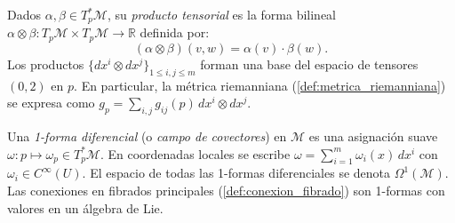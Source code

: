 \begin{definition}\label{def:producto_tensorial_covectores}
Dados $\alpha, \beta \in T_p^*\mathcal{M}$, su \textit{producto tensorial} es la forma bilineal $\alpha \otimes \beta: T_p\mathcal{M} \times T_p\mathcal{M} \to \mathbb{R}$ definida por:
\[
(\alpha \otimes \beta)(v, w) = \alpha(v) \cdot \beta(w).
\]
Los productos $\{dx^i \otimes dx^j\}_{1 \leq i,j \leq m}$ forman una base del espacio de tensores $(0,2)$ en $p$. En particular, la métrica riemanniana (\autoref{def:metrica_riemanniana}) se expresa como $g_p = \sum_{i,j} g_{ij}(p) \, dx^i \otimes dx^j$.
\end{definition}

\begin{definition}\label{def:1_forma_diferencial}
Una \textit{1-forma diferencial} (o \textit{campo de covectores}) en $\mathcal{M}$ es una asignación suave $\omega: p \mapsto \omega_p \in T_p^*\mathcal{M}$. En coordenadas locales se escribe $\omega = \sum_{i=1}^m \omega_i(x) \, dx^i$ con $\omega_i \in C^\infty(U)$. El espacio de todas las 1-formas diferenciales se denota $\Omega^1(\mathcal{M})$. Las conexiones en fibrados principales (\autoref{def:conexion_fibrado}) son 1-formas con valores en un álgebra de Lie.
\end{definition}

